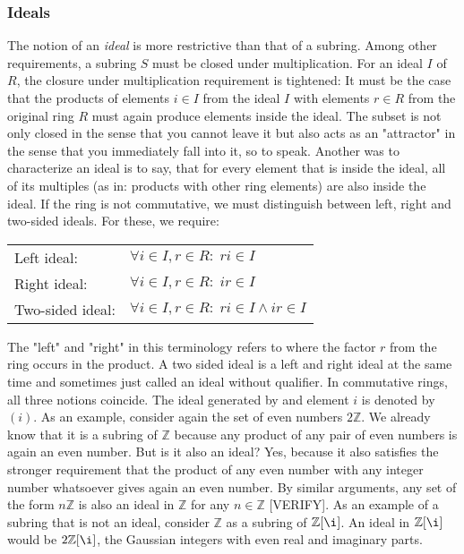 \subsubsection{Ideals}
The notion of an \emph{ideal} is more restrictive than that of a subring. Among other requirements, a subring $S$ must be closed under multiplication. For an ideal $I$ of $R$, the closure under multiplication requirement is tightened: It must be the case that the products of elements $i \in I$ from the ideal $I$ with elements $r \in R$ from the original ring $R$ must again produce elements inside the ideal. The subset is not only closed in the sense that you cannot leave it but also acts as an "attractor" in the sense that you immediately fall into it, so to speak. Another was to characterize an ideal is to say, that for every element that is inside the ideal, all of its multiples (as in: products with other ring elements) are also inside the ideal. If the ring is not commutative, we must distinguish between left, right and two-sided ideals. For these, we require:

\medskip
\begin{tabular}{l l}
Left ideal:      & $\forall i \in I, r \in R: \; r i \in I$  \\
Right ideal:     & $\forall i \in I, r \in R: \; i r \in I$  \\
Two-sided ideal: & $\forall i \in I, r \in R: \; r i \in I \wedge i r \in I$  \\
\end{tabular}
\medskip

The "left" and "right" in this terminology refers to where the factor $r$ from the ring occurs in the product. A two sided ideal is a left and right ideal at the same time and sometimes just called an ideal without qualifier. In commutative rings, all three notions coincide. The ideal generated by and element $i$ is denoted by $(i)$. As an example, consider again the set of even numbers $2 \mathbb{Z}$. We already know that it is a subring of $\mathbb{Z}$ because any product of any pair of even numbers is again an even number. But is it also an ideal? Yes, because it also satisfies the stronger requirement that the product of any even number with any integer number whatsoever gives again an even number. By similar arguments, any set of the form $n \mathbb{Z}$ is also an ideal in $\mathbb{Z}$ for any $n \in \mathbb{Z}$ [VERIFY]. As an example of a subring that is not an ideal, consider $\mathbb{Z}$ as a subring of $\mathbb{Z}[\i]$. An ideal in $\mathbb{Z}[\i]$ would be $2\mathbb{Z}[\i]$, the Gaussian integers with even real and imaginary parts.

